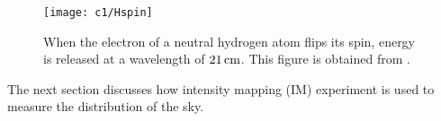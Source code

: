 
\begin{figure}[ht]
	  \centering	     
	  \texttt{[image: c1/Hspin]}	   
	  \caption{When the electron of a neutral hydrogen atom flips its spin, energy is released at a wavelength of $21\, \rm{cm}$. This figure is obtained from \cite[pg. 113]{ferrara2008first}.}
	  \label{fig:Hspin}
      \end{figure}
      \FloatBarrier
The next section discusses how intensity mapping (IM) experiment is used to measure the distribution of the sky.


